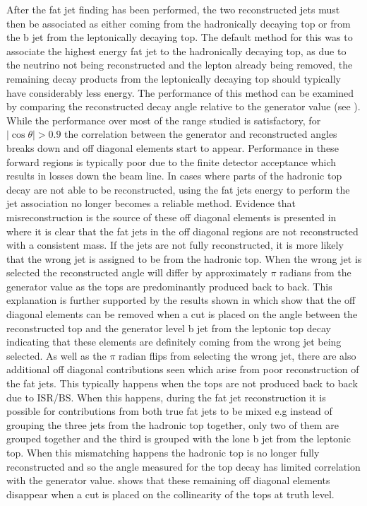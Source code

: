 After the fat jet finding has been performed, the two reconstructed jets must then be associated as either coming from the hadronically decaying top or from the b jet from the leptonically decaying top. The default method for this was to associate the highest energy fat jet to the hadronically decaying top, as due to the neutrino not being reconstructed and the lepton already being removed, the remaining decay products from the leptonically decaying top should typically have considerably less energy. The performance of this method can be examined by comparing the reconstructed decay angle relative to the generator value (see ). While the performance over most of the range studied is satisfactory, for $\mid \cos\theta \mid>0.9$ the correlation between the generator and reconstructed angles breaks down and off diagonal elements start to appear. Performance in these forward regions is typically poor due to the finite detector acceptance which results in losses down the beam line. In cases where parts of the hadronic top decay are not able to be reconstructed, using the fat jets energy to perform the jet association no longer becomes a reliable method. Evidence that misreconstruction is the source of these off diagonal elements is presented in  where it is clear that the fat jets in the off diagonal regions are not reconstructed with a consistent mass. If the jets are not fully reconstructed, it is more likely that the wrong jet is assigned to be from the hadronic top. When the wrong jet is selected the reconstructed angle will differ by approximately $\pi$ radians from the generator value as the tops are predominantly produced back to back. This explanation is further supported by the results shown in  which show that the off diagonal elements can be removed when a cut is placed on the angle between the reconstructed top and the generator level b jet from the leptonic top decay indicating that these elements are definitely coming from the wrong jet being selected. As well as the $\pi$ radian flips from selecting the wrong jet, there are also additional off diagonal contributions seen which arise from poor reconstruction of the fat jets. This typically happens when the tops are not produced back to back due to \ac{ISR}/\ac{BS}. When this happens, during the fat jet reconstruction it is possible for contributions from both true fat jets to be mixed e.g instead of grouping the three jets from the hadronic top together, only two of them are grouped together and the third is grouped with the lone b jet from the leptonic top. When this mismatching happens the hadronic top is no longer fully reconstructed and so the angle measured for the top decay has limited correlation with the generator value.  shows that these remaining off diagonal elements disappear when a cut is placed on the collinearity of the tops at truth level. 


